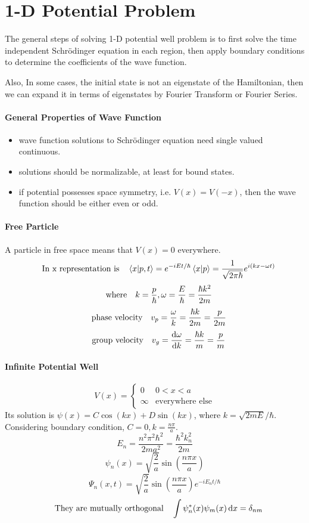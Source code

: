 \documentclass[a4paper,10pt]{article}
\begin{document}
\section{1-D Potential Problem}
The general steps of solving 1-D potential well problem is to first solve the time independent Schrödinger equation in each region, then apply boundary conditions to determine the coefficients of the wave function.

Also, In some cases, the initial state is not an eigenstate of the Hamiltonian, then we can expand it in terms of eigenstates by Fourier Transform or Fourier Series.
\paragraph{General Properties of Wave Function}
\begin{itemize}
    \item wave function solutions to Schrödinger equation need single valued continuous.
    \item solutions should be normalizable, at least for bound states.
    \item if potential possesses space symmetry, i.e. $V(x)=V(-x)$, then the wave function should be either even or odd.
\end{itemize}
\paragraph{Free Particle}
A particle in free space means that $V(x)=0$ everywhere.
$$\qq{In x representation is}\bra{x}\ket{p,t}=e^{-iEt/\hbar}\bra{x}\ket{p}=\frac{1}{\sqrt{2\pi\hbar}}e^{i(kx-\omega t)}$$
$$\qq{where}k=\frac{p}{\hbar},\omega=\frac{E}{\hbar}=\frac{\hbar k^2}{2m}$$
$$\qq{phase velocity}v_p=\frac{\omega}{k}=\frac{\hbar k}{2m}=\frac{p}{2m}$$
$$\qq{group velocity}v_g=\dv{\omega}{k}=\frac{\hbar k}{m}=\frac{p}{m}$$
\paragraph{Infinite Potential Well}
$$V(x)=\begin{cases}
        0      & 0<x<a                  \\
        \infty & \text{everywhere else}
    \end{cases}$$
Its solution is $\psi(x)=C\cos(kx)+D\sin(kx)$, where $k=\sqrt{2mE}/\hbar$. Considering boundary condition, $C=0,k=\frac{n\pi}{a}$.
$$E_n=\frac{n^2\pi^2\hbar^2}{2ma^2}=\frac{\hbar^2k_n^2}{2m}$$
$$\psi_n(x)=\sqrt{\frac{2}{a}}\sin\left(\frac{n\pi x}{a}\right)$$
$$\Psi_n(x,t)=\sqrt{\frac{2}{a}}\sin\left(\frac{n\pi x}{a}\right)e^{-iE_nt/\hbar}$$
$$\qq{They are mutually orthogonal}\int\psi_n^\ast(x)\psi_m(x)\dd{x}=\delta_{nm}$$
\end{document}
